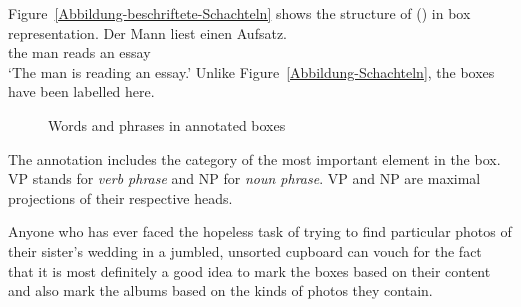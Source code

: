 {Figure~\vref{Abbildung-beschriftete-Schachteln} shows the structure of () in box representation.
\ea
\gll Der Mann liest einen Aufsatz.\\
	 the man reads an essay\\
\glt `The man is reading an essay.'
\z
Unlike Figure~\ref{Abbildung-Schachteln}, the boxes have been labelled here.
\begin{figure}
\centering
{}
\caption{\label{Abbildung-beschriftete-Schachteln}Words and phrases in annotated boxes}
\end{figure}%


The annotation includes the category of the most important element in the box. VP stands for \emph{verb phrase} and NP for \emph{noun phrase}. VP and NP are maximal projections of
their respective heads.

Anyone who has ever faced the hopeless task of trying to find particular photos of their sister's wedding in a jumbled, unsorted cupboard can vouch for the fact that it is most definitely a good idea
to mark the boxes based on their content and also mark the albums based on the kinds of photos they contain.

}
